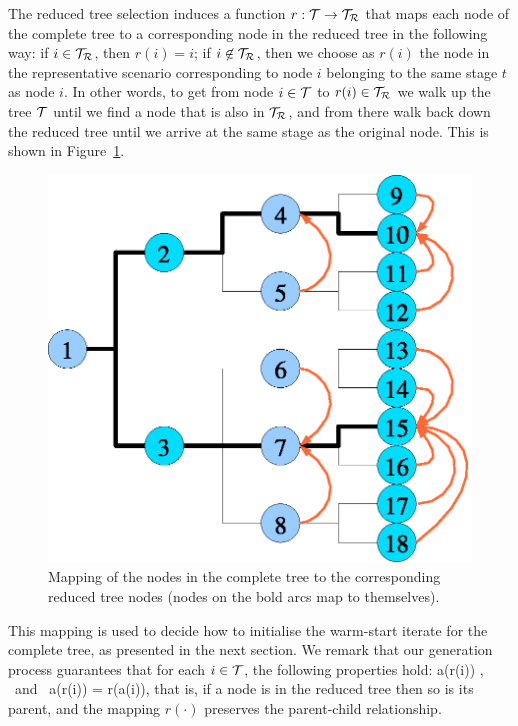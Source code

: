 The reduced tree selection induces a function $r: \mathcal{T} \to \mathcal{T}_\mathcal{R}$ 
that maps each node of the complete tree to a corresponding node 
in the reduced tree in the following way: if $i \in \mathcal{T}_\mathcal{R}$, then
$r(i) = i$; if $i\not\in \mathcal{T}_\mathcal{R}$, then we choose as $r(i)$ the node in 
the representative scenario corresponding to node $i$ belonging to the
same stage $t$ as node $i$. In other words, to get from node
$i\in\mathcal{T}$ to $r(i)\in\mathcal{T}_\mathcal{R}$ we walk up the tree $\mathcal{T}$ until we
find a node that is also in $\mathcal{T}_\mathcal{R}$, and from there walk back down
the reduced tree until we arrive at the same stage as the original node.
This is shown in Figure~\ref{fig:Mapping}.
%
\begin{figure}[ht]
  \begin{center}
    \includegraphics[scale=.6]{figures/mapping.eps}
    \caption{Mapping of the nodes in the complete tree to the corresponding
             reduced tree nodes (nodes on the bold arcs map to themselves).}
    \label{fig:Mapping}
  \end{center}
  \vspace{-3ex}
\end{figure}

This mapping is used to decide how to initialise 
the warm-start iterate for the complete tree, as presented in the
next section. We remark that our generation process guarantees
that for each $i \in \mathcal{T}$, the following properties hold:
\be  \label{eq:ReducedTreeProperties}
  a(r(i)) \in \Rtree, \quad \mbox{ and } \quad a(r(i)) = r(a(i)),
\ee
that is, if a node is in the reduced tree then so is its parent, and the
mapping $r(\cdot)$ preserves the parent-child relationship. 

